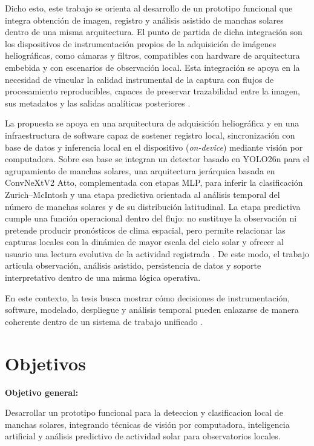 Dicho esto, este trabajo se orienta al desarrollo de un prototipo funcional que integra obtención de imagen, registro y análisis asistido de manchas solares dentro de una misma arquitectura. El punto de partida de dicha integración son los dispositivos de instrumentación propios de la adquisición de imágenes heliográficas, como cámaras y filtros, compatibles con hardware de arquitectura embebida y con escenarios de observación local. Esta integración se apoya en la necesidad de vincular la calidad instrumental de la captura con flujos de procesamiento reproducibles, capaces de preservar trazabilidad entre la imagen, sus metadatos y las salidas analíticas posteriores \citep{scherrer2012hmi,bobra2014sharp,noaaSRS}.

La propuesta se apoya en una arquitectura de adquisición heliográfica y en una infraestructura de software capaz de sostener registro local, sincronización con base de datos y inferencia local en el dispositivo (\textit{on-device}) mediante visión por computadora. Sobre esa base se integran un detector basado en YOLO26n para el agrupamiento de manchas solares, una arquitectura jerárquica basada en ConvNeXtV2 Atto, complementada con etapas MLP, para inferir la clasificación Zurich--McIntosh y una etapa predictiva orientada al análisis temporal del número de manchas solares y de su distribución latitudinal. La etapa predictiva cumple una función operacional dentro del flujo: no sustituye la observación ni pretende producir pronósticos de clima espacial, pero permite relacionar las capturas locales con la dinámica de mayor escala del ciclo solar y ofrecer al usuario una lectura evolutiva de la actividad registrada \citep{podladchikova2012kalman,schmid2010dmd,kutz2016dmd}. De este modo, el trabajo articula observación, análisis asistido, persistencia de datos y soporte interpretativo dentro de una misma lógica operativa.

En este contexto, la tesis busca mostrar cómo decisiones de instrumentación, software, modelado, despliegue y análisis temporal pueden enlazarse de manera coherente dentro de un sistema de trabajo unificado \citep{clette2007wolf,hathaway2015solarcycle}.

\section{Objetivos}

\textbf{Objetivo general:}

Desarrollar un prototipo funcional para la deteccion y clasificacion local de manchas solares, integrando técnicas de visión por computadora, inteligencia artificial y análisis predictivo de actividad solar para observatorios locales.

